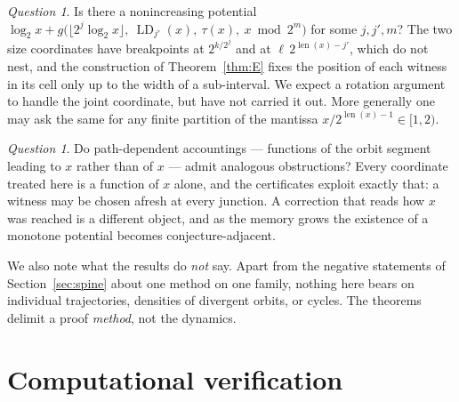 \documentclass[11pt]{article}
\theoremstyle{definition}
\theoremstyle{remark}
\newtheorem{question}[theorem]{Question}
\newcommand{\bitlen}{\operatorname{len}}
\newcommand{\LD}{\operatorname{LD}}
\begin{document}
\begin{question}\label{q:joint}
Is there a nonincreasing potential
$\log_2x+g\bigl(\lfloor2^{j}\log_2x\rfloor,\ \LD_{j'}(x),\ \tau(x),\
x\bmod2^{m}\bigr)$ for some $j,j',m$? The two size coordinates have
breakpoints at $2^{k/2^{j}}$ and at $\ell\,2^{\bitlen(x)-j'}$, which do
not nest, and the construction of Theorem~\ref{thm:E} fixes the position
of each witness in its cell only up to the width of a sub-interval. We
expect a rotation argument to handle the joint coordinate, but have not
carried it out. More generally one may ask the same for any finite
partition of the mantissa $x/2^{\bitlen(x)-1}\in[1,2)$.
\end{question}

\begin{question}\label{q:path}
Do path-dependent accountings --- functions of the orbit segment leading
to $x$ rather than of $x$ --- admit analogous obstructions? Every
coordinate treated here is a function of $x$ alone, and the certificates
exploit exactly that: a witness may be chosen afresh at every junction.
A correction that reads how $x$ was reached is a different object, and
as the memory grows the existence of a monotone potential becomes
conjecture-adjacent.
\end{question}

We also note what the results do \emph{not} say. Apart from the
negative statements of Section~\ref{sec:spine} about one method on one
family, nothing here bears on individual trajectories, densities of
divergent orbits, or cycles. The theorems delimit a proof \emph{method},
not the dynamics.

\section{Computational verification}\label{sec:verification}
\end{document}
